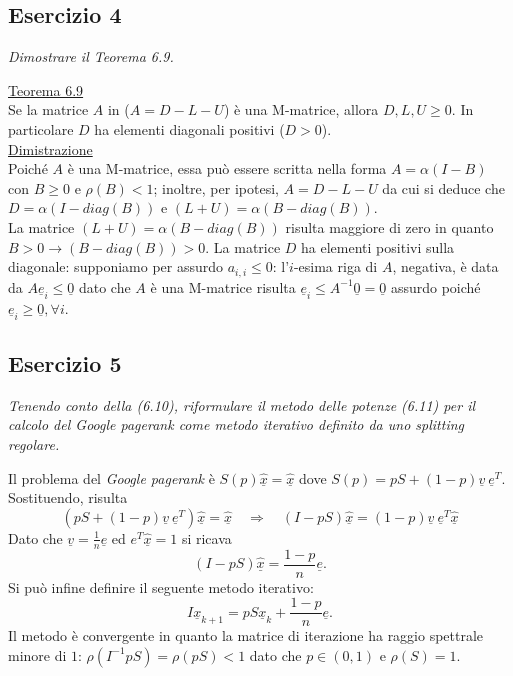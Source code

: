 \subsection{Esercizio 4}
\label{sub:es4}
\emph{Dimostrare il Teorema 6.9.}
\begin{sol}
  \underline{Teorema 6.9}\\
  Se la matrice $A$ in ($A=D-L-U$) è una M-matrice, allora $D,L,U\geq 0$.
   In particolare $D$ ha elementi diagonali positivi ($D>0$).\\
  \underline{Dimistrazione}\\
  Poiché $A$ è una M-matrice, essa può essere scritta nella forma $A=\alpha(I-B)$ con $B\geq 0$ e $\rho(B)<1$;
   inoltre, per ipotesi, $A=D-L-U$ da cui si deduce che $D=\alpha(I-diag(B))$ e $(L+U)=\alpha(B-diag(B))$.\\
  La matrice $(L+U)=\alpha(B-diag(B))$ risulta maggiore di zero in quanto $B>0\rightarrow (B-diag(B))>0$.
  La matrice $D$ ha elementi positivi sulla diagonale: supponiamo per assurdo $a_{i,i}\leq 0$:
    l'$i$-esima riga di $A$, negativa, è data da $A\underline{e}_i\leq\underline{0}$ dato che $A$ è una M-matrice risulta
    $\underline{e}_i\leq A^{-1}\underline{0}=\underline{0}$ assurdo poiché $\underline{e}_i\geq\underline{0}, \forall i$.
\end{sol}
\subsection{Esercizio 5}
\label{sub:es5}
\emph{Tenendo conto della (6.10), riformulare il metodo delle potenze (6.11) per il calcolo del \textit{Google pagerank} come metodo iterativo definito da uno splitting regolare.}
\begin{sol}
  Il problema del \textsl{Google pagerank} è $S(p)\hat{\underline{x}}=\hat{\underline{x}}$ dove $S(p)=pS+(1-p)\underline{v}\:\underline{e}^{T}$. Sostituendo, risulta
   $$(pS+(1-p)\underline{v}\:\underline{e}^{T})\hat{\underline{x}}=\hat{\underline{x}}\quad\Rightarrow\quad (I-pS)\hat{\underline{x}}=(1-p)\underline{v}\:\underline{e}^T\hat{\underline{x}}$$
  Dato che $\underline{v}=\frac{1}{n}\underline{e}$ ed $e^T\hat{\underline{x}}=1$ si ricava
  $$(I-pS)\hat{\underline{x}}=\frac{1-p}{n}\underline{e}.$$
  Si può infine definire il seguente metodo iterativo:
  $$I\underline{x}_{k+1}=pS\underline{x}_k+\dfrac{1-p}{n}\underline{e}.$$
  Il metodo è convergente in quanto la matrice di iterazione ha raggio spettrale minore di $1$: $\rho(I^{-1}pS)=\rho(pS)<1$ dato che $p \in (0,1)$ e $\rho(S)=1$.
\end{sol}

